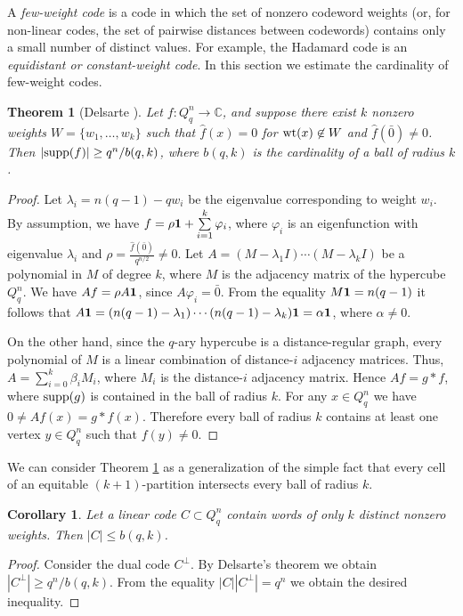 \documentclass[11pt]{article}
\newtheorem{theorem}{Theorem}[section]
\newtheorem{corollary}{Corollary}[section]
\theoremstyle{definition}
\newcommand{\supp}{{\rm supp}}
\newcommand{\wt}{{\rm wt}}
\begin{document}
{{{A {\sl few-weight code} is a code in which the set of nonzero codeword weights (or, for non-linear codes, the set of pairwise distances between codewords) contains only a small number of distinct values.
For example, the Hadamard code is an {\sl equidistant or constant-weight code}. In this section we estimate the cardinality of few-weight codes.

\begin{theorem}[Delsarte \cite{Delsarte73}]\label{th:Del1}
Let $f:Q^n_q\rightarrow\mathbb{C}$, and suppose there exist $k$ nonzero weights $W=\{w_1,\dots,w_k\}$ such that $\widehat{f}(x)=0$ for $\wt(x)\not \in W$ and $\widehat{f}(\bar 0)\neq 0$. Then $|\supp(f)|\geq q^n/b(q,k)$, where $b(q,k)$ is the cardinality of a ball of radius $k$.
\end{theorem}
\begin{proof}
Let $\lambda_i=n(q-1)-qw_i$ be the eigenvalue corresponding to weight $w_i$. By assumption, we have $f=\rho{\bf 1}+\sum\limits_{i=1}^k\varphi_i$, where $\varphi_i$ is an eigenfunction with eigenvalue $\lambda_i$ and $\rho=\frac{\widehat{f}(\bar 0)}{q^{n/2}}\neq 0$. Let $A=(M-\lambda_1I)\cdots(M-\lambda_kI)$ be a polynomial  in $M$ of degree $k$, where $M$ is the adjacency matrix of the hypercube $Q^n_q$. We have $Af= \rho A{\bf 1}$, since $A\varphi_i=\bar 0$. From the equality $M{\bf 1}=n(q-1)$ it follows that $A{\bf 1}= (n(q-1)-\lambda_1)\cdots(n(q-1)-\lambda_k){\bf 1}=\alpha{\bf 1}$, where $\alpha\neq 0$.

On the other hand,  since the $q$-ary hypercube is a distance-regular graph, every polynomial of $M$ is a linear combination of distance-$i$ adjacency matrices. Thus, $A=\sum\limits_{i=0}^k \beta_iM_i$, where $M_i$ is the distance-$i$ adjacency matrix. Hence $Af=g*f$, where $\supp(g)$ is contained in the ball of radius $k$. For any $x\in Q^n_q$ we have $0\neq Af(x)=g*f(x)$. Therefore every ball of radius $k$ contains at least one vertex
 $y\in Q^n_q$ such that $f(y)\neq 0$.
\end{proof}

We can consider Theorem \ref{th:Del1} as a generalization of the simple fact that every cell of an equitable 
$(k+1)$-partition intersects  every ball of radius $k$. 


\begin{corollary}\label{corDel}
Let a linear code $C\subset Q^n_q$ contain words of only $k$ distinct nonzero weights. Then $|C|\leq b(q,k)$.
\end{corollary}
\begin{proof}
Consider the dual code $C^\perp$. By Delsarte's theorem we obtain $|C^\perp|\geq q^n/b(q,k)$. From the equality $|C||C^\perp|=q^n$ we obtain the desired inequality.
\end{proof}

}}}
\end{document}
